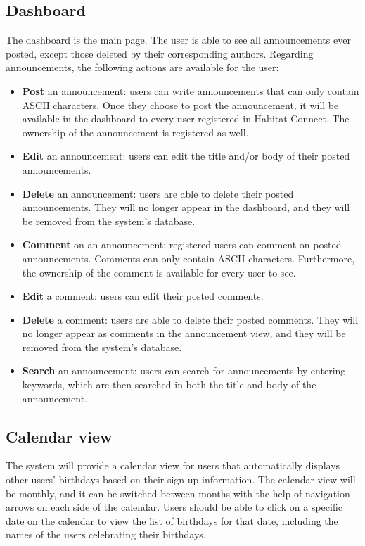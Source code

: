 \documentclass[conference]{IEEEtran}
\begin{document}
\subsection{Dashboard}
The dashboard is the main page. The user is able to see all announcements ever posted, except those deleted by their corresponding authors. Regarding announcements, the following actions are available for the user:
\begin{itemize}
    \item \textbf{Post} an announcement: users can write announcements that can only contain ASCII characters. Once they choose to post the announcement, it will be available in the dashboard to every user registered in Habitat Connect. The ownership of the announcement is registered as well..
    \item \textbf{Edit} an announcement: users can edit the title and/or body of their posted announcements.
    \item \textbf{Delete} an announcement: users are able to delete their posted announcements. They will no longer appear in the dashboard, and they will be removed from the system’s database.
    \item \textbf{Comment} on an announcement: registered users can comment on posted announcements. Comments can only contain ASCII characters. Furthermore, the ownership of the comment is available for every user to see.
    \item \textbf{Edit} a comment: users can edit their posted comments.
    \item \textbf{Delete} a comment: users are able to delete their posted comments. They will no longer appear as comments in the announcement view, and they will be removed from the system’s database.
    \item \textbf{Search} an announcement: users can search for announcements by entering keywords, which are then searched in both the title and body of the announcement.
\end{itemize}
\subsection{Calendar view}
The system will provide a calendar view for users that automatically displays other users' birthdays based on their sign-up information. The calendar view will be monthly, and it can be switched between months with the help of navigation arrows on each side of the calendar. Users should be able to click on a specific date on the calendar to view the list of birthdays for that date, including the names of the users celebrating their birthdays.
\end{document}
